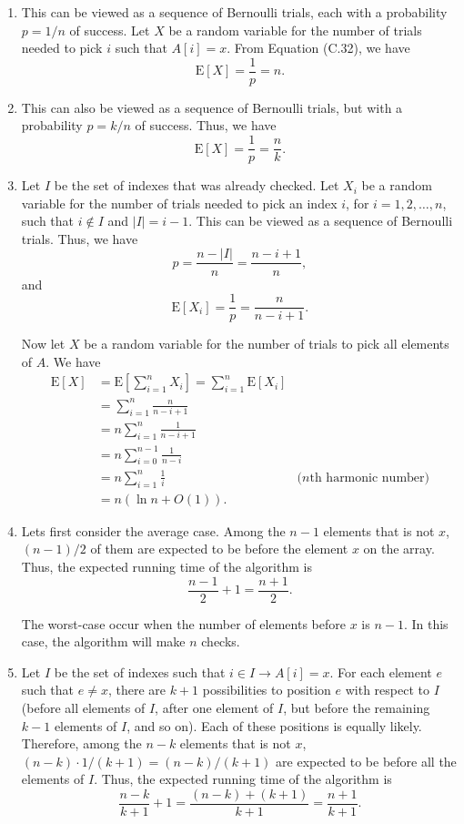 \begin{enumerate}
\begin{framed}
\begin{enumerate}
\item This can be viewed as a sequence of Bernoulli trials, each with
a probability $p = 1/n$ of success. Let $X$ be a random variable for the number
of trials needed to pick $i$ such that $A[i] = x$. From Equation (C.32), we have
\[
  \text{E}[X] = \frac{1}{p} = n.
\]

\item This can also be viewed as a sequence of Bernoulli trials, but with
a probability $p = k/n$ of success. Thus, we have
\[
  \text{E}[X] = \frac{1}{p} = \frac{n}{k}.
\]

\item Let $I$ be the set of indexes that was already checked. Let $X_i$ be
a random variable for the number of trials needed to pick an index $i$, for
$i = 1, 2, \dots, n$, such that $i \notin I$ and $|I| = i - 1$. This can be
viewed as a sequence of Bernoulli trials. Thus, we have
\[
  p = \frac{n - |I|}{n} = \frac{n - i + 1}{n},
\]
and
\[
  \text{E}[X_i] = \frac{1}{p} = \frac{n}{n - i + 1}.
\]

Now let $X$ be a random variable for the number of trials to pick all elements
of $A$. We have
\begin{equation*}
\begin{aligned}
  \text{E}[X] &= \text{E}\left[\sum_{i = 1}^{n} X_i \right]
              = \sum_{i = 1}^{n} \text{E}[X_i]\\
              &= \sum_{i = 1}^{n} \frac{n}{n - i + 1}\\
              &= n \sum_{i = 1}^{n} \frac{1}{n - i + 1}\\
              &= n \sum_{i = 0}^{n - 1} \frac{1}{n - i}\\
              &= n \sum_{i = 1}^{n} \frac{1}{i} & \text{($n$th harmonic number)}\\
              &= n (\ln n + O(1)).
\end{aligned}
\end{equation*}

\item Lets first consider the average case. Among the $n - 1$ elements that is
not $x$, $(n - 1)/2$ of them are expected to be before the element $x$ on the
array. Thus, the expected running time of the algorithm is
\[
  \frac{n - 1}{2} + 1 = \frac{n + 1}{2}.
\]

The worst-case occur when the number of elements before $x$ is $n - 1$. In this
case, the algorithm will make $n$ checks.

\item Let $I$ be the set of indexes such that $i \in I \rightarrow A[i] = x$.
For each element $e$ such that $e \neq x$, there are $k + 1$ possibilities to
position $e$ with respect to $I$ (before all elements of $I$, after one
element of $I$, but before the remaining $k - 1$ elements of $I$, and so on).
Each of these positions is equally likely.  Therefore, among the $n - k$
elements that is not $x$, $(n - k) \cdot 1/(k + 1) = (n - k)/(k + 1)$ are
expected to be before all the elements of $I$. Thus, the expected running time
of the algorithm is
\[
  \frac{n - k}{k + 1} + 1 = \frac{(n - k) + (k + 1)}{k + 1} = \frac{n + 1}{k + 1}.
\]


\end{enumerate}
\end{framed}
\end{enumerate}
